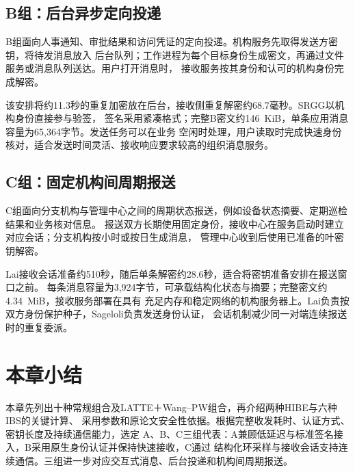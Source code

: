 \subsection{B组：后台异步定向投递}
B组面向人事通知、审批结果和访问凭证的定向投递。机构服务先取得发送方密钥，将待发消息放入
后台队列；工作进程为每个目标身份生成密文，再通过文件服务或消息队列送达。用户打开消息时，
接收服务按其身份和认可的机构身份完成解密。

该安排将约11.3秒的重复加密放在后台，接收侧重复解密约68.7毫秒。SRGG以机构身份直接参与验签，
签名采用紧凑格式；完整B密文约146~KiB，单条应用消息容量为65,364字节。发送任务可以在业务
空闲时处理，用户读取时完成快速身份核对，适合发送时间灵活、接收响应要求较高的组织消息服务。

\subsection{C组：固定机构间周期报送}
C组面向分支机构与管理中心之间的周期状态报送，例如设备状态摘要、定期巡检结果和业务核对信息。
报送双方长期使用固定身份，接收中心在服务启动时建立对应会话；分支机构按小时或按日生成消息，
管理中心收到后使用已准备的叶密钥解密。

Lai接收会话准备约510秒，随后单条解密约28.6秒，适合将密钥准备安排在报送窗口之前。
每条消息容量为3,924字节，可承载结构化状态与摘要；完整密文约4.34~MiB，接收服务部署在具有
充足内存和稳定网络的机构服务器上。Lai负责按双方身份保护种子，Sageloli负责发送身份认证，
会话机制减少同一对端连续报送时的重复委派。

\section{本章小结}

本章先列出十种常规组合及LATTE＋Wang--PW组合，再介绍两种HIBE与六种IBS的关键计算、
采用参数和原论文安全性依据。根据完整收发耗时、认证方式、密钥长度及持续通信能力，选定
A、B、C三组代表：A兼顾低延迟与标准签名接入，B采用原生身份认证并保持快速接收，C通过
结构化环采样与接收会话支持连续通信。三组进一步对应交互式消息、后台投递和机构间周期报送。
